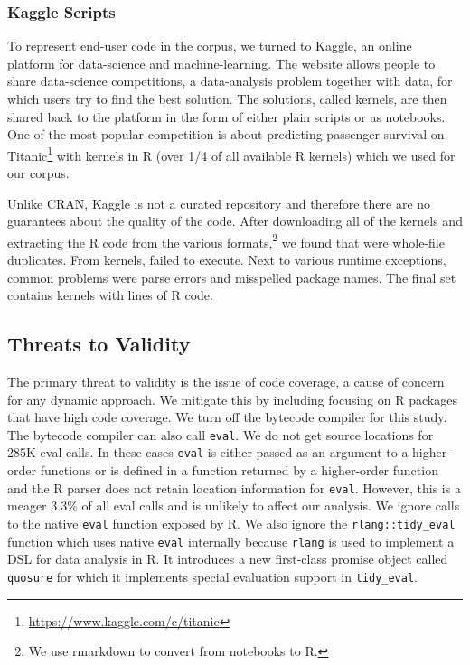 \documentclass[a4paper,USenglish,cleveref, autoref, thm-restate]{lipics-v2019}
\newcommand{\UndefinedEvalsRnd}{285K\xspace}
\newcommand{\PercentUndefinedEval}{3.3\%\xspace}
\newcommand{\eval}{\texttt{eval}\xspace}
\renewcommand{\c}[1]{\lstinline{#1}\xspace}
\begin{document}
\subsubsection{Kaggle Scripts}

To represent end-user code in the corpus, we turned to Kaggle, an online
platform for data-science and machine-learning. The website allows people to
share data-science competitions, a data-analysis problem together with data,
for which users try to find the best solution. The solutions, called
{kernels}, are then shared back to the platform in the form of either plain
scripts or as notebooks.  One of the most popular competition is about
predicting passenger survival on
Titanic\footnote{\url{https://www.kaggle.com/c/titanic}} with \CorpusKaggle
kernels in R (over 1/4 of all available R kernels) which we used for our
corpus.

Unlike CRAN, Kaggle is not a curated repository and therefore there are no
guarantees about the quality of the code. After downloading all of the
\CorpusKaggle kernels and extracting the R code from the various
formats,\footnote{We use {\sf rmarkdown} to convert from notebooks to R.} we
found that \CorpusDuplicatedKaggle were whole-file duplicates. From
\CorpusRunnableKaggle kernels, \CorpusFailedKaggle failed to execute. Next
to various runtime exceptions, common problems were parse errors and
misspelled package names.  The final set contains \CorpusFinishedKaggle
kernels with \CorpusFinishedKaggleCodeRnd lines of R code.

\subsection{Threats to Validity}
The primary threat to validity is the issue of
code coverage, a cause of concern for any dynamic approach. We mitigate this
by including focusing on R packages that have high code coverage. We turn
off the bytecode compiler for this study. The bytecode compiler can also
call \eval. We do not get source locations for \UndefinedEvalsRnd eval
calls. In these cases \eval is either passed as an argument to a
higher-order functions or is defined in a function returned by a
higher-order function and the R parser does not retain location information
for \eval. However, this is a meager \PercentUndefinedEval of all eval calls
and is unlikely to affect our analysis. We ignore calls to the native \eval
function exposed by R. We also ignore the \c{rlang::tidy_eval} function
which uses native \eval internally because \c{rlang} is used to implement a
DSL for data analysis in R. It introduces a new first-class promise object
called \c{quosure} for which it implements special evaluation support in
\c{tidy_eval}.
\end{document}
